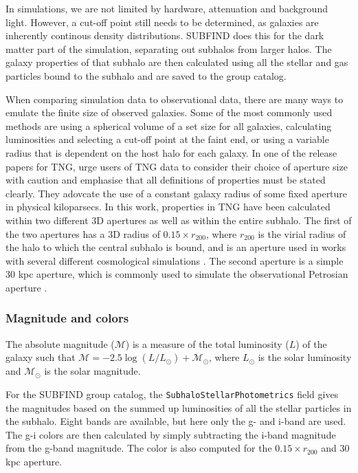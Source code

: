 In simulations, we are not limited by hardware, attenuation and background light. However, a cut-off point still needs to be determined, as galaxies are inherently continous density distributions. SUBFIND does this for the dark matter part of the simulation, separating out subhalos from larger halos. The galaxy properties of that subhalo are then calculated using all the stellar and gas particles bound to the subhalo and are saved to the group catalog. 

When comparing simulation data to observational data, there are many ways to emulate the finite size of observed galaxies. Some of the most commonly used methods are using a spherical volume of a set size for all galaxies, calculating luminosities and selecting a cut-off point at the faint end, or using a variable radius that is dependent on the host halo for each galaxy. In one of the release papers for TNG, \textcite{Pillepich2017} urge users of TNG data to consider their choice of aperture size with caution and emphasise that all definitions of properties must be stated clearly. They adovcate the use of a constant galaxy radius of some fixed aperture in physical kiloparsecs. In this work, properties in TNG have been calculated within two different 3D apertures as well as within the entire subhalo. The first of the two apertures has a 3D radius of $0.15 \times r_{200}$, where $r_{200}$ is the virial radius of the halo to which the central subhalo is bound, and is an aperture used in works with several different cosmological simulations \parencite{Ferrero2020}. The second aperture is a simple 30 kpc aperture, which is commonly used to simulate the observational Petrosian aperture \parencite{Schaye2015}.

\subsubsection{Magnitude and colors}

The absolute magnitude ($\mathcal{M}$) is a measure of the total luminosity ($L$) of the galaxy such that $\mathcal{M} = -2.5 \log(L/L_\odot) + \mathcal{M}_\odot$, where $L_\odot$ is the solar luminosity and $\mathcal{M}_\odot$ is the solar magnitude.

For the SUBFIND group catalog, the \texttt{SubhaloStellarPhotometrics} field gives the magnitudes based on the summed up luminosities of all the stellar particles in the subhalo. Eight bands are available, but here only the g- and i-band are used. The g-i colors are then calculated by simply subtracting the i-band magnitude from the g-band magnitude. The color is also computed for the $0.15 \times r_{200}$ and 30 kpc aperture.

